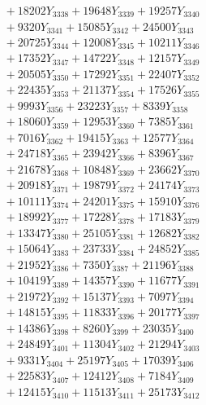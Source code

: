 \documentclass[a4paper,10pt]{article}
\begin{document}
{\begin{align}
&\;  + 18202 Y_{3338} + 19648 Y_{3339} + 19257 Y_{3340} \\[0.3ex]
&\;  + 9320 Y_{3341} + 15085 Y_{3342} + 24500 Y_{3343} \\[0.3ex]
&\;  + 20725 Y_{3344} + 12008 Y_{3345} + 10211 Y_{3346} \\[0.3ex]
&\;  + 17352 Y_{3347} + 14722 Y_{3348} + 12157 Y_{3349} \\[0.3ex]
&\;  + 20505 Y_{3350} + 17292 Y_{3351} + 22407 Y_{3352} \\[0.3ex]
&\;  + 22435 Y_{3353} + 21137 Y_{3354} + 17526 Y_{3355} \\[0.3ex]
&\;  + 9993 Y_{3356} + 23223 Y_{3357} + 8339 Y_{3358} \\[0.5ex]\allowbreak
&\;  + 18060 Y_{3359} + 12953 Y_{3360} + 7385 Y_{3361} \\[0.3ex]
&\;  + 7016 Y_{3362} + 19415 Y_{3363} + 12577 Y_{3364} \\[0.3ex]
&\;  + 24718 Y_{3365} + 23942 Y_{3366} + 8396 Y_{3367} \\[0.3ex]
&\;  + 21678 Y_{3368} + 10848 Y_{3369} + 23662 Y_{3370} \\[0.3ex]
&\;  + 20918 Y_{3371} + 19879 Y_{3372} + 24174 Y_{3373} \\[0.3ex]
&\;  + 10111 Y_{3374} + 24201 Y_{3375} + 15910 Y_{3376} \\[0.3ex]
&\;  + 18992 Y_{3377} + 17228 Y_{3378} + 17183 Y_{3379} \\[0.3ex]
&\;  + 13347 Y_{3380} + 25105 Y_{3381} + 12682 Y_{3382} \\[0.3ex]
&\;  + 15064 Y_{3383} + 23733 Y_{3384} + 24852 Y_{3385} \\[0.3ex]
&\;  + 21952 Y_{3386} + 7350 Y_{3387} + 21196 Y_{3388} \\[0.5ex]\allowbreak
&\;  + 10419 Y_{3389} + 14357 Y_{3390} + 11677 Y_{3391} \\[0.3ex]
&\;  + 21972 Y_{3392} + 15137 Y_{3393} + 7097 Y_{3394} \\[0.3ex]
&\;  + 14815 Y_{3395} + 11833 Y_{3396} + 20177 Y_{3397} \\[0.3ex]
&\;  + 14386 Y_{3398} + 8260 Y_{3399} + 23035 Y_{3400} \\[0.3ex]
&\;  + 24849 Y_{3401} + 11304 Y_{3402} + 21294 Y_{3403} \\[0.3ex]
&\;  + 9331 Y_{3404} + 25197 Y_{3405} + 17039 Y_{3406} \\[0.3ex]
&\;  + 22583 Y_{3407} + 12412 Y_{3408} + 7184 Y_{3409} \\[0.3ex]
&\;  + 12415 Y_{3410} + 11513 Y_{3411} + 25173 Y_{3412} \\[0.3ex]

\end{align}}
\end{document}
